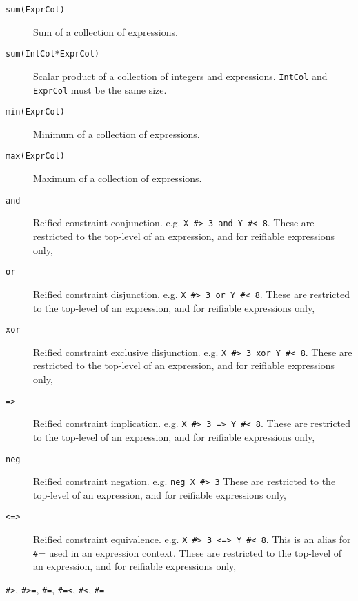 \begin{description}
\item[\texttt{sum(ExprCol)}]
	    Sum of a collection of expressions.

\item[\texttt{sum(IntCol*ExprCol)}]
	    Scalar product of a collection of integers and expressions.
            \verb'IntCol' and \verb'ExprCol' must be the same size.

\item[\texttt{min(ExprCol)}]
	    Minimum of a collection of expressions.

\item[\texttt{max(ExprCol)}]
	    Maximum of a collection of expressions.

\item[\texttt{and}]
	    Reified constraint conjunction.  e.g. \verb'X #> 3 and Y #< 8'.
            These are restricted to the top-level of an expression,
            and for reifiable expressions only,

\item[\texttt{or}]
	    Reified constraint disjunction.  e.g. \verb'X #> 3 or Y #< 8'.
            These are restricted to the top-level of an expression,
            and for reifiable expressions only,

\item[\texttt{xor}]
	    Reified constraint exclusive disjunction.  e.g. \verb'X #> 3 xor Y #< 8'.
            These are restricted to the top-level of an expression,
            and for reifiable expressions only,

\item[\texttt{=>}]
	    Reified constraint implication.  e.g. \verb'X #> 3 => Y #< 8'.
            These are restricted to the top-level of an expression,
            and for reifiable expressions only,

\item[\texttt{neg}]
	    Reified constraint negation.  e.g. \verb'neg X #> 3'
            These are restricted to the top-level of an expression,
            and for reifiable expressions only,

\item[\texttt{<=>}]
	    Reified constraint equivalence.  e.g. \verb'X #> 3 <=> Y #< 8'.
            This is an alias for {\texttt \#=} used in an expression context.
            These are restricted to the top-level of an expression,
            and for reifiable expressions only,

\item[
    \texttt{\#>}, \texttt{\#>=}, \texttt{\#=}, \texttt{\#=<},
 \texttt{\#<},
    \texttt{\#\bsl=}]


\end{description}
